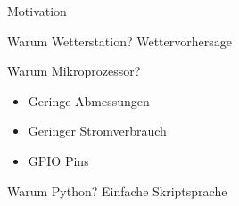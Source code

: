 \begin{frame}[t]{Motivation}
  \begin{block}{Warum Wetterstation?}
    Wettervorhersage
  \end{block}
  \begin{block}{Warum Mikroprozessor?}
    \begin{itemize}
      \item Geringe Abmessungen
      \item Geringer Stromverbrauch
      \item GPIO Pins
    \end{itemize}
  \end{block}
  \begin{block}{Warum Python?}
    Einfache Skriptsprache
  \end{block}
\end{frame}
